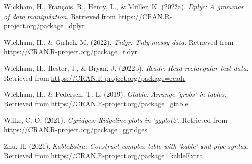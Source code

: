 \documentclass[
  english,
  man]{apa6}
\begin{document}
\leavevmode\hypertarget{ref-R-dplyr}{}%
Wickham, H., François, R., Henry, L., \& Müller, K. (2022a). \emph{Dplyr: A grammar of data manipulation}. Retrieved from \url{https://CRAN.R-project.org/package=dplyr}

\leavevmode\hypertarget{ref-R-tidyr}{}%
Wickham, H., \& Girlich, M. (2022). \emph{Tidyr: Tidy messy data}. Retrieved from \url{https://CRAN.R-project.org/package=tidyr}

\leavevmode\hypertarget{ref-R-readr}{}%
Wickham, H., Hester, J., \& Bryan, J. (2022b). \emph{Readr: Read rectangular text data}. Retrieved from \url{https://CRAN.R-project.org/package=readr}

\leavevmode\hypertarget{ref-R-gtable}{}%
Wickham, H., \& Pedersen, T. L. (2019). \emph{Gtable: Arrange 'grobs' in tables}. Retrieved from \url{https://CRAN.R-project.org/package=gtable}

\leavevmode\hypertarget{ref-R-ggridges}{}%
Wilke, C. O. (2021). \emph{Ggridges: Ridgeline plots in 'ggplot2'}. Retrieved from \url{https://CRAN.R-project.org/package=ggridges}

\leavevmode\hypertarget{ref-R-kableExtra}{}%
Zhu, H. (2021). \emph{KableExtra: Construct complex table with 'kable' and pipe syntax}. Retrieved from \url{https://CRAN.R-project.org/package=kableExtra}

\endgroup
\end{document}
